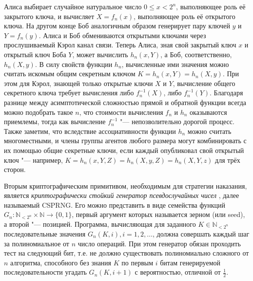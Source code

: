 Алиса выбирает случайное натуральное число $0 \le x < 2^n$, выполняющее роль её закрытого ключа, и вычисляет $X = f_n(x)$, выполняющее роль её открытого ключа. На другом конце Боб аналогичным образом генерирует пару ключей $y$ и $Y = f_n(y)$. Алиса и Боб обмениваются открытыми ключами через прослушиваемый Кэрол канал связи. Теперь Алиса, зная свой закрытый ключ $x$ и открытый ключ Боба $Y$, может вычислить $h_n(x, Y)$, а Боб, соответственно, $h_n(X, y)$. В силу свойств функции $h_n$, вычисленные ими значения можно считать искомым общим секретным ключом $K = h_n(x, Y) = h_n(X, y)$. При этом для Кэрол, знающей только открытые ключи $X$ и $Y$, вычисление общего секретного ключа требует вычисления либо $f_n^{-1}(X)$, либо $f_n^{-1}(Y)$. Благодаря разнице между асимптотической сложностью прямой и обратной функции всегда можно подобрать такое $n$, что стоимости вычисления $f_n$ и $h_n$ оказываются приемлемы, тогда как вычисление $f_n^{-1}$ "--- непозволительно дорогой процесс. Также заметим, что вследствие ассоциативности функции $h_n$ можно считать многоместными, и члены группы агентов любого размера могут комбинировать с их помощью общие секретные ключи, если каждый опубликовал свой открытый ключ "--- например, $K = h_n(x, Y, Z) = h_n(X, y, Z) = h_n(X, Y, z)$ для трёх сторон.

Вторым криптографическим примитивом, необходимым для стратегии наказания, является \emph{криптографически стойкий генератор псевдослучайных чисел} \cite{Gutmann}, далее называемый CSPRNG. Его можно представить в виде семейства функций $G_n : \mathbb{N}_{<2^n} \times \mathbb{N} \rightarrow \{0, 1\}$, первый аргумент которых называется зерном (или seed), а второй "--- позицией. Программа, вычисляющая для заданного $K \in \mathbb{N}_{<2^n}$ последовательные значения $G_n(K, i), i = 1, 2, \ldots$, должна совершать каждый шаг за полиномиальное от $n$ число операций. При этом генератор обязан проходить тест на следующий бит, т.е. не должно существовать полиномиально сложного от $n$ алгоритма, способного без знания $K$ по первым $i$ битам генерируемой последовательности угадать $G_n(K, i+1)$ с вероятностью, отличной от $\frac{1}{2}$.

